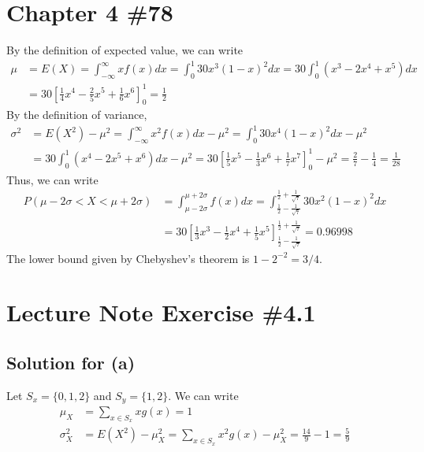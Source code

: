 \documentclass{scrartcl}
\begin{document}
\section{Chapter 4 \#78}
By the definition of expected value, we can write
\begin{align*}
  \mu
  &= E(X)
  = \int^\infty_{-\infty} xf(x) dx
  = \int^1_0 30x^3 (1 - x)^2 dx
  = 30 \int^1_0 (x^3 - 2x^4 + x^5) dx \\
  &= 30 \left[ \frac{1}{4} x^4 - \frac{2}{5} x^5 + \frac{1}{6} x^6 \right]^1_0
  = \frac{1}{2}
\end{align*}
By the definition of variance,
\begin{align*}
  \sigma^2
  &= E(X^2) - \mu^2
  = \int^\infty_{-\infty} x^2 f(x) dx - \mu^2
  = \int^1_0 30x^4 (1 - x)^2 dx - \mu^2 \\
  &= 30 \int^1_0 (x^4 - 2x^5 + x^6) dx - \mu^2
  = 30 \left[ \frac{1}{5} x^5 - \frac{1}{3} x^6 + \frac{1}{7} x^7 \right]^1_0
    - \mu^2
  = \frac{2}{7} - \frac{1}{4}
  = \frac{1}{28}
\end{align*}
Thus, we can write
\begin{align*}
  P(\mu - 2\sigma < X < \mu + 2\sigma)
  &= \int^{\mu + 2\sigma}_{\mu - 2\sigma} f(x) dx
  = \int^{\frac{1}{2} + \frac{1}{\sqrt{7}}}_{\frac{1}{2} - \frac{1}{\sqrt{7}}}
    30x^2(1 - x)^2 dx \\
  &= 30 \left[ \frac{1}{3} x^3 - \frac{1}{2} x^4 + \frac{1}{5} x^5 \right]^{\frac{1}{2} + \frac{1}{\sqrt{7}}}_{\frac{1}{2} - \frac{1}{\sqrt{7}}}
  = 0.96998
\end{align*}
The lower bound given by Chebyshev's theorem is \(1 - 2^{-2} = 3/4\).

\section{Lecture Note Exercise \#4.1}
\subsection{Solution for (a)}
Let \(S_x = \{0, 1, 2\}\) and \(S_y = \{1, 2\}\). We can write
\begin{align*}
  \mu_X
  &= \sum_{x \in S_x} xg(x) = 1 \\
  \sigma^2_X
  &= E(X^2) - \mu^2_X
  = \sum_{x \in S_x} x^2 g(x) - \mu^2_X
  = \frac{14}{9} - 1 = \frac{5}{9}
\end{align*}
\end{document}
